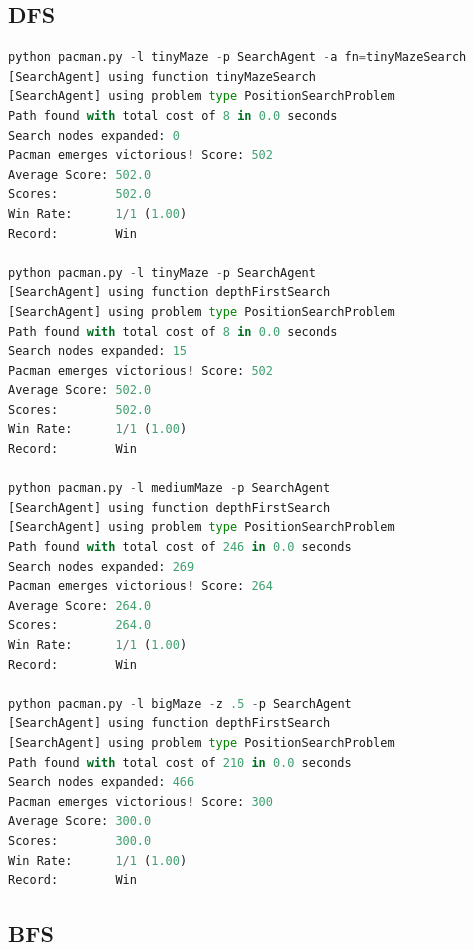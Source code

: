\documentclass{report}
\begin{document}
        \subsection{DFS}
          \begin{lstlisting}[language=Python, caption=Prueba DFS]
python pacman.py -l tinyMaze -p SearchAgent -a fn=tinyMazeSearch
[SearchAgent] using function tinyMazeSearch
[SearchAgent] using problem type PositionSearchProblem
Path found with total cost of 8 in 0.0 seconds
Search nodes expanded: 0
Pacman emerges victorious! Score: 502
Average Score: 502.0
Scores:        502.0
Win Rate:      1/1 (1.00)
Record:        Win

python pacman.py -l tinyMaze -p SearchAgent
[SearchAgent] using function depthFirstSearch
[SearchAgent] using problem type PositionSearchProblem
Path found with total cost of 8 in 0.0 seconds
Search nodes expanded: 15
Pacman emerges victorious! Score: 502
Average Score: 502.0
Scores:        502.0
Win Rate:      1/1 (1.00)
Record:        Win

python pacman.py -l mediumMaze -p SearchAgent
[SearchAgent] using function depthFirstSearch
[SearchAgent] using problem type PositionSearchProblem
Path found with total cost of 246 in 0.0 seconds
Search nodes expanded: 269
Pacman emerges victorious! Score: 264
Average Score: 264.0
Scores:        264.0
Win Rate:      1/1 (1.00)
Record:        Win

python pacman.py -l bigMaze -z .5 -p SearchAgent
[SearchAgent] using function depthFirstSearch
[SearchAgent] using problem type PositionSearchProblem
Path found with total cost of 210 in 0.0 seconds
Search nodes expanded: 466
Pacman emerges victorious! Score: 300
Average Score: 300.0
Scores:        300.0
Win Rate:      1/1 (1.00)
Record:        Win
          \end{lstlisting}
        \clearpage\subsection{BFS}
\end{document}
